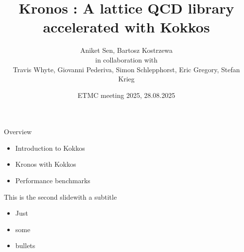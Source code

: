 
\graphicspath{{graphics/}}

\title[Kronos]{Kronos : A lattice QCD library accelerated with Kokkos}
\author[A. Sen]{Aniket Sen, Bartosz Kostrzewa  \\ \vspace{0.2cm} in collaboration with \\ \vspace{0.2cm} \centering Travis Whyte, Giovanni Pederiva, Simon Schlepphorst, Eric Gregory, Stefan Krieg}
\date[ETMC meeting 2025]{\small ETMC meeting 2025, 28.08.2025}
\subject{subject}




\begin{frame}
  \titlepage{}
\end{frame}


\begin{frame}{Overview}
  \begin{itemize}
    \item Introduction to Kokkos
    \item Kronos with Kokkos
    \item Performance benchmarks
  \end{itemize}
\end{frame}

\begin{frame}{This is the second slide}{with a subtitle}
  \begin{itemize}
    \item Just
    \item some
    \item bullets
  \end{itemize}
\end{frame}

